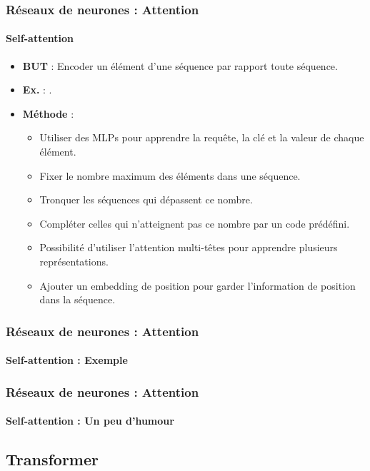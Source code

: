 \documentclass[xcolor=table]{beamer}
\begin{document}
\begin{frame}
	\frametitle{Réseaux de neurones : Attention}
	\framesubtitle{Self-attention}
	
	\begin{itemize}
		\item \textbf{BUT} : Encoder un élément d'une séquence par rapport toute séquence.
		\item \textbf{Ex.} : .
		\item \textbf{Méthode} :
		\begin{itemize}
			\item Utiliser des MLPs pour apprendre la requête, la clé et la valeur de chaque élément.
			\item Fixer le nombre maximum des éléments dans une séquence.
			\item Tronquer les séquences qui dépassent ce nombre.
			\item Compléter celles qui n'atteignent pas ce nombre par un code prédéfini.
			\item Possibilité d'utiliser l'attention multi-têtes pour apprendre plusieurs représentations.
			\item Ajouter un embedding de position pour garder l'information de position dans la séquence.
		\end{itemize}
	\end{itemize}
	
\end{frame}

\begin{frame}
	\frametitle{Réseaux de neurones : Attention}
	\framesubtitle{Self-attention : Exemple}
	
	\begin{center}
	\end{center}
	
\end{frame}

\begin{frame}
	\frametitle{Réseaux de neurones : Attention}
	\framesubtitle{Self-attention : Un peu d'humour}
	
	
\end{frame}


\subsection{Transformer}
\end{document}
